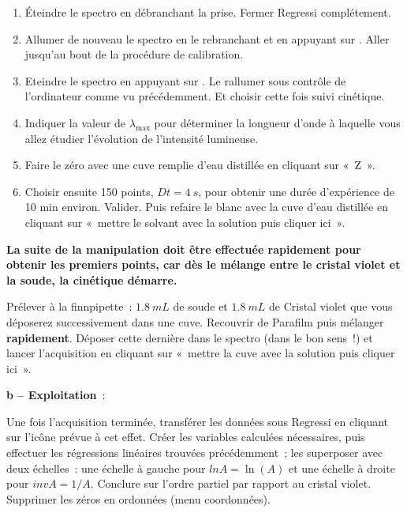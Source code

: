 \documentclass[a4paper, 11pt, final, garamond]{book}
\begin{document}
\begin{enumerate}
    \item Éteindre le spectro en débranchant la prise. Fermer Regressi
        complétement. 
    \item Allumer de nouveau le spectro en le rebranchant et en appuyant sur
        . Aller jusqu'au bout de la procédure de calibration. 
    \item Eteindre le spectro en appuyant sur . Le rallumer sous
        contrôle de l'ordinateur comme vu précédemment. Et choisir cette fois
        suivi cinétique. 
    \item Indiquer la valeur de $\lambda_{\max}$ pour déterminer la longueur
        d'onde à laquelle vous allez étudier l'évolution de l'intensité
        lumineuse.
    \item Faire le zéro avec une cuve remplie d'eau distillée en cliquant sur
        «~Z~». 
    \item Choisir ensuite 150 points, $Dt=\SI{4}{s}$, pour obtenir une durée
        d'expérience de 10 min environ. Valider. Puis refaire le blanc avec la
        cuve d'eau distillée en cliquant sur «~mettre le solvant avec la
        solution puis cliquer ici~».
\end{enumerate}
 
\begin{rrapp}{}
    \begin{center}
        \textbf{La suite de la manipulation doit être effectuée rapidement pour
            obtenir les premiers points, car dès le mélange entre le cristal
        violet et la soude, la cinétique démarre.}
    \end{center}
\end{rrapp}

Prélever à la finnpipette~: $\SI{1,8}{mL}$ de soude et $\SI{1,8}{mL}$ de Cristal
violet que vous déposerez successivement dans une cuve. Recouvrir de Parafilm
puis mélanger \textbf{rapidement}. Déposer cette dernière dans le spectro (dans
le bon sens~!) et lancer l'acquisition en cliquant sur «~mettre la cuve avec la
solution puis cliquer ici~».
 
\bigskip

\textbf{b -- Exploitation}~:

Une fois l'acquisition terminée, transférer les données sous Regressi en
cliquant sur l'icône prévue à cet effet. Créer les variables calculées
nécessaires, puis effectuer les régressions linéaires trouvées précédemment~;
les superposer avec deux échelles~: une échelle à gauche pour $lnA = \ln(A)$ et
une échelle à droite pour $invA = 1 / A$. Conclure sur l'ordre partiel par
rapport au cristal violet. Supprimer les zéros en ordonnées (menu coordonnées).
\end{document}
